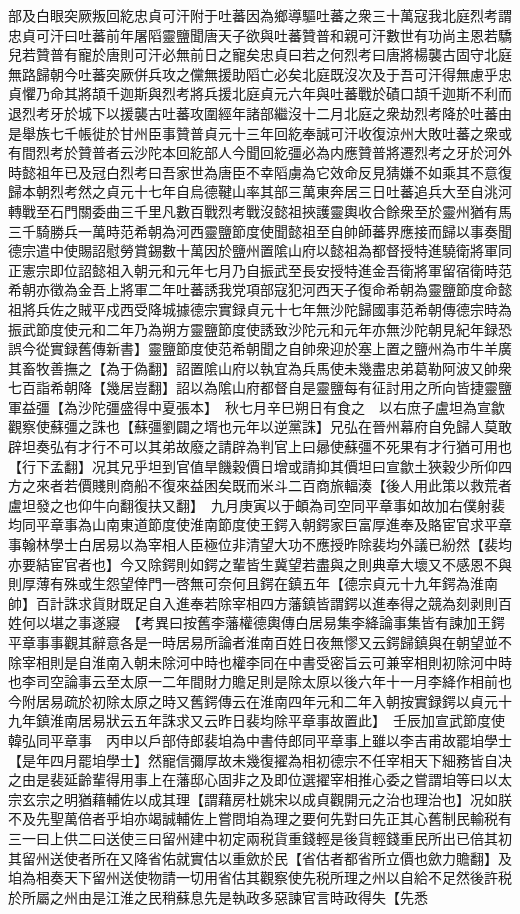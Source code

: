 部及白眼突厥叛回紇忠貞可汗附于吐蕃因為鄉導驅吐蕃之衆三十萬寇我北庭烈考謂忠貞可汗曰吐蕃前年屠䧟靈鹽聞唐天子欲與吐蕃贊普和親可汗數世有功尚主恩若驕兒若贊普有寵於唐則可汗必無前日之寵矣忠貞曰若之何烈考曰唐將楊襲古固守北庭無路歸朝今吐蕃突厥併兵攻之儻無援助䧟亡必矣北庭既沒次及于吾可汗得無慮乎忠貞懼乃命其將頡千迦斯與烈考將兵援北庭貞元六年與吐蕃戰於磧口頡千迦斯不利而退烈考牙於城下以援襲古吐蕃攻圍經年諸部繼沒十二月北庭之衆劫烈考降於吐蕃由是舉族七千帳徙於甘州臣事贊普貞元十三年回紇奉誠可汗收復涼州大敗吐蕃之衆或有間烈考於贊普者云沙陀本回紇部人今聞回紇彊必為内應贊普將遷烈考之牙於河外時懿祖年已及冠白烈考曰吾家世為唐臣不幸䧟虜為它效命反見猜嫌不如乘其不意復歸本朝烈考然之貞元十七年自烏德鞬山率其部三萬東奔居三日吐蕃追兵大至自洮河轉戰至石門關委曲三千里凡數百戰烈考戰沒懿祖挾護靈輿收合餘衆至於靈州猶有馬三千騎勝兵一萬時范希朝為河西靈鹽節度使聞懿祖至自帥師蕃界應接而歸以事奏聞德宗遣中使賜詔慰勞賞錫數十萬因於鹽州置隂山府以懿祖為都督授特進驍衛將軍同正憲宗即位詔懿祖入朝元和元年七月乃自振武至長安授特進金吾衛將軍留宿衛時范希朝亦徵為金吾上將軍二年吐蕃誘我党項部寇犯河西天子復命希朝為靈鹽節度命懿祖將兵佐之賊平戍西受降城據德宗實録貞元十七年無沙陀歸國事范希朝傳德宗時為振武節度使元和二年乃為朔方靈鹽節度使誘致沙陀元和元年亦無沙陀朝見紀年録恐誤今從實録舊傳新書】靈鹽節度使范希朝聞之自帥衆迎於塞上置之鹽州為市牛羊廣其畜牧善撫之【為于偽翻】詔置隂山府以執宜為兵馬使未幾盡忠弟葛勒阿波又帥衆七百詣希朝降【幾居豈翻】詔以為隂山府都督自是靈鹽每有征討用之所向皆捷靈鹽軍益彊【為沙陀彊盛得中夏張本】　秋七月辛巳朔日有食之　以右庶子盧坦為宣歙觀察使蘇彊之誅也【蘇彊劉闢之壻也元年以逆黨誅】兄弘在晉州幕府自免歸人莫敢辟坦奏弘有才行不可以其弟故廢之請辟為判官上曰曏使蘇彊不死果有才行猶可用也【行下孟翻】况其兄乎坦到官值旱饑穀價日增或請抑其價坦曰宣歙土狹穀少所仰四方之來者若價賤則商船不復來益困矣既而米斗二百商旅輻湊【後人用此策以救荒者盧坦發之也仰牛向翻復扶又翻】　九月庚寅以于頔為司空同平章事如故加右僕射裴均同平章事為山南東道節度使淮南節度使王鍔入朝鍔家巨富厚進奉及賂宦官求平章事翰林學士白居易以為宰相人臣極位非清望大功不應授昨除裴均外議已紛然【裴均亦要結宦官者也】今又除鍔則如鍔之輩皆生冀望若盡與之則典章大壞又不感恩不與則厚薄有殊或生怨望倖門一啓無可奈何且鍔在鎮五年【德宗貞元十九年鍔為淮南帥】百計誅求貨財既足自入進奉若除宰相四方藩鎮皆謂鍔以進奉得之競為刻剥則百姓何以堪之事遂寢　【考異曰按舊李藩權德輿傳白居易集李絳論事集皆有諫加王鍔平章事事觀其辭意各是一時居易所論者淮南百姓日夜無憀又云鍔歸鎮與在朝望並不除宰相則是自淮南入朝未除河中時也權李同在中書受密旨云可兼宰相則初除河中時也李司空論事云至太原一二年間財力贍足則是除太原以後六年十一月李絳作相前也今附居易疏於初除太原之時又舊鍔傳云在淮南四年元和二年入朝按實録鍔以貞元十九年鎮淮南居易狀云五年誅求又云昨日裴均除平章事故置此】　壬辰加宣武節度使韓弘同平章事　丙申以戶部侍郎裴垍為中書侍郎同平章事上雖以李吉甫故罷垍學士【是年四月罷垍學士】然寵信彌厚故未幾復擢為相初德宗不任宰相天下細務皆自决之由是裴延齡輩得用事上在藩邸心固非之及即位選擢宰相推心委之嘗謂垍等曰以太宗玄宗之明猶藉輔佐以成其理【謂藉房杜姚宋以成貞觀開元之治也理治也】况如朕不及先聖萬倍者乎垍亦竭誠輔佐上嘗問垍為理之要何先對曰先正其心舊制民輸税有三一曰上供二曰送使三曰留州建中初定兩税貨重錢輕是後貨輕錢重民所出已倍其初其留州送使者所在又降省佑就實估以重歛於民【省估者都省所立價也歛力贍翻】及垍為相奏天下留州送使物請一切用省估其觀察使先税所理之州以自給不足然後許税於所屬之州由是江淮之民稍蘇息先是執政多惡諫官言時政得失【先悉
